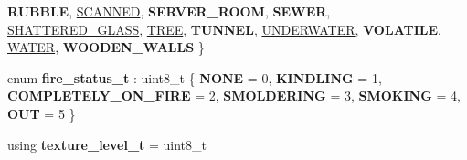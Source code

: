 \begin{DoxyCompactItemize}
{\bfseries R\+U\+B\+B\+LE}, 
\hyperlink{structroom__data_a9552b46091ee649079e41f04f9543b8eaf720715094a47343cdaedb80ee92b401}{S\+C\+A\+N\+N\+ED}, 
{\bfseries S\+E\+R\+V\+E\+R\+\_\+\+R\+O\+OM}, 
{\bfseries S\+E\+W\+ER}, 
\newline
\hyperlink{structroom__data_a9552b46091ee649079e41f04f9543b8ea1e70c1275b57dd3371316f49c780c059}{S\+H\+A\+T\+T\+E\+R\+E\+D\+\_\+\+G\+L\+A\+SS}, 
\hyperlink{structroom__data_a9552b46091ee649079e41f04f9543b8eac23f1e799abbde1e381716a170ddfb8e}{T\+R\+EE}, 
{\bfseries T\+U\+N\+N\+EL}, 
\hyperlink{structroom__data_a9552b46091ee649079e41f04f9543b8eac33d8731543e03593fd28f74c3499827}{U\+N\+D\+E\+R\+W\+A\+T\+ER}, 
\newline
{\bfseries V\+O\+L\+A\+T\+I\+LE}, 
\hyperlink{structroom__data_a9552b46091ee649079e41f04f9543b8ea10a6d00e0451c8741ee965acdb891835}{W\+A\+T\+ER}, 
{\bfseries W\+O\+O\+D\+E\+N\+\_\+\+W\+A\+L\+LS}
 \}
\item 
\mbox{\label{structroom__data_aad8501e5aeeaa48dd1ac944d62cf06cb}} 
enum {\bfseries fire\+\_\+status\+\_\+t} \+: uint8\+\_\+t \{ \newline
{\bfseries N\+O\+NE} = 0, 
{\bfseries K\+I\+N\+D\+L\+I\+NG} = 1, 
{\bfseries C\+O\+M\+P\+L\+E\+T\+E\+L\+Y\+\_\+\+O\+N\+\_\+\+F\+I\+RE} = 2, 
{\bfseries S\+M\+O\+L\+D\+E\+R\+I\+NG} = 3, 
\newline
{\bfseries S\+M\+O\+K\+I\+NG} = 4, 
{\bfseries O\+UT} = 5
 \}
\item 
\mbox{\label{structroom__data_a1c9d12fd8be2e38c8f4f13be1fa245e6}} 
using {\bfseries texture\+\_\+level\+\_\+t} = uint8\+\_\+t
\end{DoxyCompactItemize}
